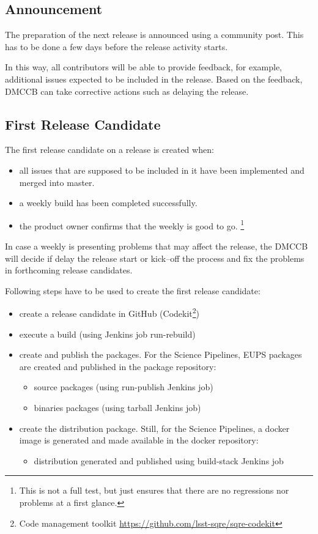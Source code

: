 \subsection{Announcement} \label{sec:anaouncement}

The preparation of the next release is announced using a community post.
This has to be done a few days before the release activity starts.

In this way, all contributors will be able to provide feedback, for example, additional issues expected to be included in the release.
Based on the feedback, DMCCB can take corrective actions such as delaying the release.


\subsection{First Release Candidate} \label{sec:firstrc}

The first release candidate on a release is created when:

\begin{itemize}
\item all issues that are supposed to be included in it have been implemented and merged into master.
\item a weekly build has been completed successfully.
\item the product owner confirms that the weekly is good to go. \footnote{This is not a full test, but just ensures that there are no regressions nor problems at a first glance.}
\end{itemize}

In case a weekly is presenting problems that may affect the release, the DMCCB will decide if delay the release start or kick--off the process and fix the problems in forthcoming release candidates.


Following steps have to be used to create the first release candidate:

\begin{itemize}
\item create a release candidate in GitHub (Codekit\footnote{Code management toolkit \url{https://github.com/lsst-sqre/sqre-codekit}})
\item execute a build (using Jenkins job run-rebuild)
\item create and publish the packages. For the Science Pipelines, EUPS packages are created and published in the package repository:
   \begin{itemize}
   \item source packages (using run-publish Jenkins job)
   \item binaries packages (using tarball Jenkins job)
   \end{itemize}
\item create the distribution package. Still, for the Science Pipelines, a docker image is generated and made available in the docker repository:
   \begin{itemize}
   \item distribution generated and published using build-stack Jenkins job
   \end{itemize}
\end{itemize}


